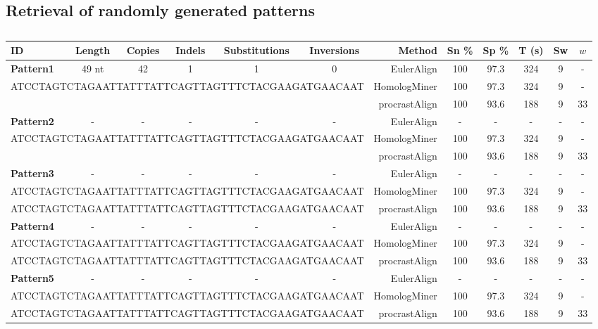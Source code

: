\documentclass[twoside,11pt]{article}
\begin{document}
\subsection{Retrieval of randomly generated patterns}
\begin{table}[b]
\scriptsize
  \centering
\begin{tabular}{|lccccc||rccccc|}
\hline ID & Length & Copies & Indels & Substitutions & Inversions & Method & Sn \% & Sp \% & T (s) & Sw & $w$ \\
\hline
\hline \textbf{Pattern1} &  49 nt &  42 & 1 & 1 & 0 & EulerAlign & 100 & 97.3 & 324 & 9 & - \\
\multicolumn{6}{|c||}{\tiny ATCCTAGTCTAGAATTATTTATTCAGTTAGTTTCTACGAAGATGAACAAT} & HomologMiner & 100 & 97.3 & 324 & 9 & - \\
\multicolumn{6}{|c||}{\tiny }& procrastAlign & 100 & 93.6 & 188 & 9 & 33 \\
\hline \textbf{Pattern2} &   - &  - & - & - & - & EulerAlign & - & - & - & - & -  \\
\multicolumn{6}{|c||}{\tiny ATCCTAGTCTAGAATTATTTATTCAGTTAGTTTCTACGAAGATGAACAAT} & HomologMiner & 100 & 97.3 & 324 & 9 & - \\
\multicolumn{6}{|c||}{\tiny }& procrastAlign & 100 & 93.6 & 188 & 9 & 33 \\
\hline \textbf{Pattern3} & - &  - & - & - & - & EulerAlign & - & -& - & - & - \\
\multicolumn{6}{|c||}{\tiny ATCCTAGTCTAGAATTATTTATTCAGTTAGTTTCTACGAAGATGAACAAT} & HomologMiner & 100 & 97.3 & 324 & 9 & - \\
\multicolumn{6}{|c||}{\tiny ATCCTAGTCTAGAATTATTTATTCAGTTAGTTTCTACGAAGATGAACAAT}& procrastAlign & 100 & 93.6 & 188 & 9 & 33 \\
\hline \textbf{Pattern4} & - & - & - & - & - & EulerAlign & -& -& - & - & - \\
\multicolumn{6}{|c||}{\tiny ATCCTAGTCTAGAATTATTTATTCAGTTAGTTTCTACGAAGATGAACAAT} & HomologMiner & 100 & 97.3 & 324 & 9 & - \\
\multicolumn{6}{|c||}{\tiny ATCCTAGTCTAGAATTATTTATTCAGTTAGTTTCTACGAAGATGAACAAT}& procrastAlign & 100 & 93.6 & 188 & 9 & 33 \\
\hline \textbf{Pattern5} & - & - & - & - & - & EulerAlign & -& -& - & - & - \\
\multicolumn{6}{|c||}{\tiny ATCCTAGTCTAGAATTATTTATTCAGTTAGTTTCTACGAAGATGAACAAT} & HomologMiner & 100 & 97.3 & 324 & 9 & - \\
\multicolumn{6}{|c||}{\tiny ATCCTAGTCTAGAATTATTTATTCAGTTAGTTTCTACGAAGATGAACAAT}& procrastAlign & 100 & 93.6 & 188 & 9 & 33 \\
\hline
\end{tabular}
\vspace{0.1cm}
 \label{tab-results}
  \caption{}
 
\end{table}
\end{document}
